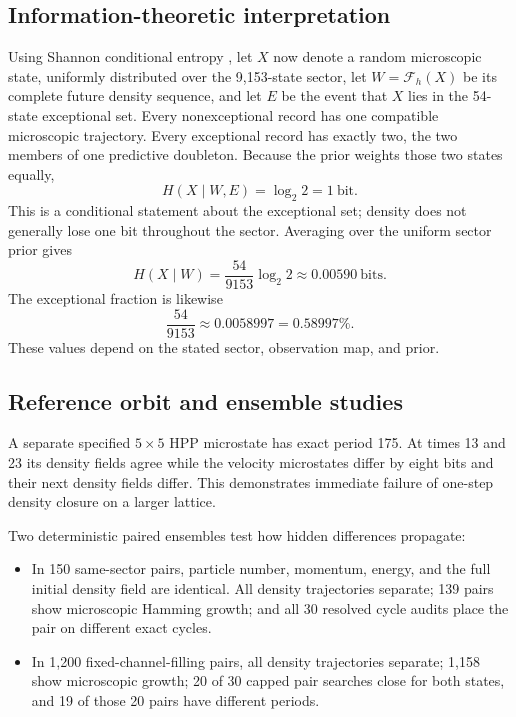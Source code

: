 \documentclass[11pt]{article}
\newcommand{\Future}{\mathcal{F}}
\begin{document}
\subsection{Information-theoretic interpretation}

Using Shannon conditional entropy \cite{shannon1948}, let $X$ now denote a
random microscopic state, uniformly distributed over the 9,153-state sector, let
$W=\Future_h(X)$ be its complete future density sequence, and let $E$ be the
event that $X$ lies in the 54-state exceptional set. Every nonexceptional record
has one compatible microscopic trajectory.
Every exceptional record has exactly two, the two members of one predictive
doubleton. Because the prior weights those two states equally,
\[
H(X\mid W,E)=\log_2 2=1\ \text{bit}.
\]
This is a conditional statement about the exceptional set; density does not
generally lose one bit throughout the sector. Averaging over the uniform sector
prior gives
\[
H(X\mid W)
=\frac{54}{9153}\log_2 2
\approx0.00590\ \text{bits}.
\]
The exceptional fraction is likewise
\[
\frac{54}{9153}\approx0.0058997=0.58997\%.
\]
These values depend on the stated sector, observation map, and prior.

\subsection{Reference orbit and ensemble studies}

A separate specified $5\times5$ HPP microstate has exact period 175. At times 13
and 23 its density fields agree while the velocity microstates differ by eight
bits and their next density fields differ. This demonstrates immediate failure of
one-step density closure on a larger lattice.

Two deterministic paired ensembles test how hidden differences propagate:
\begin{itemize}[leftmargin=1.5em]
  \item In 150 same-sector pairs, particle number, momentum, energy, and the full
  initial density field are identical. All density trajectories separate; 139
  pairs show microscopic Hamming growth; and all 30 resolved cycle audits place
  the pair on different exact cycles.
  \item In 1,200 fixed-channel-filling pairs, all density trajectories separate;
  1,158 show microscopic growth; 20 of 30 capped pair searches close for both
  states, and 19 of those 20 pairs have different periods.
\end{itemize}
\end{document}
